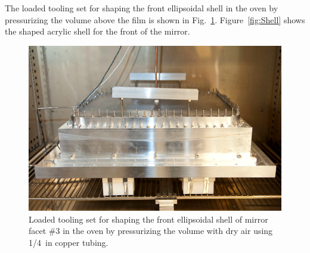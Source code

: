 The loaded tooling set for shaping the front ellipsoidal shell in the oven by pressurizing the volume above the film is
shown in  Fig.~\ref{fig:Pres_Shaping_Front}. Figure~\ref{fig:Shell} shows the shaped acrylic shell for the front of
the mirror.


\begin{figure}[ht]
    \centering
    \includegraphics[width=0.95\linewidth]{images/Pres_Shaping_Front.png}
    \caption{Loaded tooling set for shaping the front ellipsoidal shell of mirror facet \#3 in the oven by pressurizing
      the volume with dry air using 1/4~in copper tubing.}
    \label{fig:Pres_Shaping_Front}
\end{figure}

